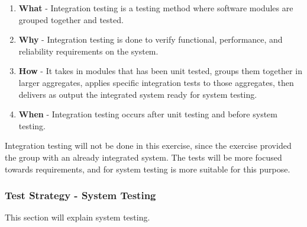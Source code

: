 \begin{enumerate}
    \item \textbf{What} - Integration testing is a testing method where software modules are grouped together and tested. 
    \item \textbf{Why} - Integration testing is done to verify functional, performance, and reliability requirements on the system. 
    \item \textbf{How} - It takes in modules that has been unit tested, groups them together in larger aggregates, applies specific integration tests to those aggregates, then delivers as output the integrated system ready for system testing. 
    \item \textbf{When} - Integration testing occurs after unit testing and before system testing. 
\end{enumerate}

\noindent Integration testing will not be done in this exercise, since the exercise provided the group with an already integrated system. The tests will be more focused towards requirements, and for system testing is more suitable for this purpose. 

\subsubsection{Test Strategy - System Testing}
This section will explain system testing.

